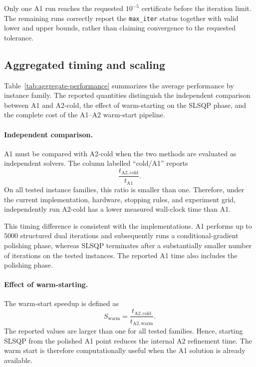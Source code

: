 \documentclass[12pt]{article}
\begin{document}
Only one A1 run reaches the requested $10^{-5}$ certificate before the
iteration limit. The remaining runs correctly report the
\texttt{max\_iter} status together with valid lower and upper bounds,
rather than claiming convergence to the requested tolerance.

\subsection{Aggregated timing and scaling}

Table~\ref{tab:aggregate-performance} summarizes the average
performance by instance family. The reported quantities distinguish
the independent comparison between A1 and A2-cold, the effect of
warm-starting on the SLSQP phase, and the complete cost of the
A1--A2 warm-start pipeline.

\begin{table}[htbp]
    \centering
    \caption{Average computational performance by instance family.
    A2-cold denotes an independent SLSQP run from the uniform feasible
    point. A2-warm denotes only the SLSQP refinement started from the
    polished A1 solution. The pipeline time is
    $t_{\mathrm{A1}}+t_{\mathrm{A2,warm}}$.}
    \label{tab:aggregate-performance}
    \resizebox{\textwidth}{!}{%
        
    }
\end{table}

\paragraph{Independent comparison.}
A1 must be compared with A2-cold when the two methods are evaluated as
independent solvers. The column labelled ``cold/A1'' reports
\[
\frac{t_{\mathrm{A2,cold}}}{t_{\mathrm{A1}}}.
\]
On all tested instance families, this ratio is smaller than one.
Therefore, under the current implementation, hardware, stopping rules,
and experiment grid, independently run A2-cold has a lower measured
wall-clock time than A1.

This timing difference is consistent with the implementations. A1
performs up to $5000$ structured dual iterations and subsequently runs
a conditional-gradient polishing phase, whereas SLSQP terminates after
a substantially smaller number of iterations on the tested instances.
The reported A1 time also includes the polishing phase.

\paragraph{Effect of warm-starting.}
The warm-start speedup is defined as
\[
S_{\mathrm{warm}}
=
\frac{t_{\mathrm{A2,cold}}}
     {t_{\mathrm{A2,warm}}}.
\]
The reported values are larger than one for all tested families.
Hence, starting SLSQP from the polished A1 point reduces the internal
A2 refinement time. The warm start is therefore computationally useful
when the A1 solution is already available.
\end{document}
